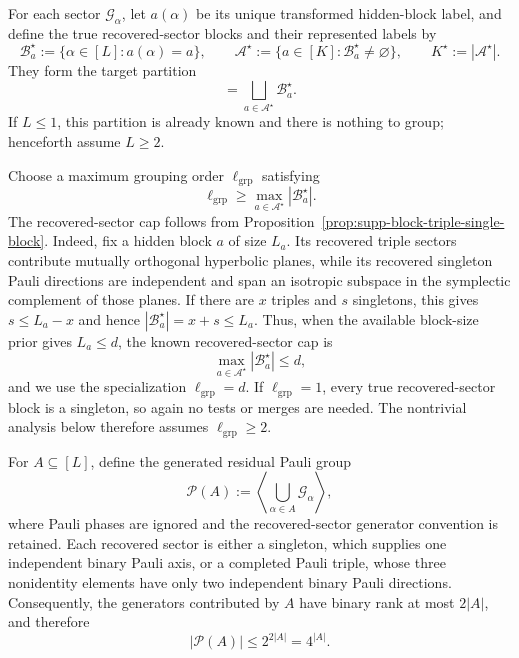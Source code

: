\documentclass[
  aps,
  prx,
  reprint,
  superscriptaddress,
  amsmath,
  amssymb,
  nofootinbib,
  longbibliography
]{revtex4-2}
\begin{document}
For each sector $\mathcal G_\alpha$, let $a(\alpha)$ be its unique
transformed hidden-block label, and define the true recovered-sector blocks
and their represented labels by
\begin{equation}
\mathcal B_a^\star
:=
\{\alpha\in[L]:a(\alpha)=a\},
\qquad
\mathcal A^\star
:=
\{a\in[K]:\mathcal B_a^\star\ne\varnothing\},
\qquad
K^\star:=|\mathcal A^\star|.
\label{eq:supp-true-recovered-sector-blocks}
\end{equation}
They form the target partition
\begin{equation}
[L]
=
\bigsqcup_{a\in\mathcal A^\star}\mathcal B_a^\star.
\label{eq:supp-true-recovered-sector-partition}
\end{equation}
If $L\le1$, this partition is already known and there is nothing to group;
henceforth assume $L\ge2$.

Choose a maximum grouping order $\ell_{\mathrm{grp}}$ satisfying
\begin{equation}
\ell_{\mathrm{grp}}
\ge
\max_{a\in\mathcal A^\star}|\mathcal B_a^\star|.
\label{eq:supp-grouping-order-promise}
\end{equation}
The recovered-sector cap follows from
Proposition~\ref{prop:supp-block-triple-single-block}.  Indeed, fix a hidden
block $a$ of size $L_a$.  Its recovered triple sectors contribute mutually
orthogonal hyperbolic planes, while its recovered singleton Pauli directions are
independent and span an isotropic subspace in the symplectic complement of
those planes.  If there are $x$ triples and $s$ singletons, this gives
$s\le L_a-x$ and hence
$|\mathcal B_a^\star|=x+s\le L_a$.  Thus, when the available block-size
prior gives $L_a\le d$, the known recovered-sector cap is
\begin{equation}
\max_{a\in\mathcal A^\star}|\mathcal B_a^\star|\le d,
\end{equation}
and we use the specialization $\ell_{\mathrm{grp}}=d$.  If
$\ell_{\mathrm{grp}}=1$, every true recovered-sector block is a singleton,
so again no tests or merges are needed.  The nontrivial analysis below
therefore assumes $\ell_{\mathrm{grp}}\ge2$.

For $A\subseteq[L]$, define the generated residual Pauli group
\begin{equation}
\mathcal P(A)
:=
\left\langle
\bigcup_{\alpha\in A}\mathcal G_\alpha
\right\rangle,
\label{eq:supp-cluster-pauli-set}
\end{equation}
where Pauli phases are ignored and the recovered-sector generator convention
is retained.  Each recovered sector is either a singleton, which supplies
one independent binary Pauli axis, or a completed Pauli triple, whose three
nonidentity elements have only two independent binary Pauli directions.  Consequently,
the generators contributed by $A$ have binary rank at most $2|A|$, and
therefore
\begin{equation}
|\mathcal P(A)|
\le
2^{2|A|}
=
4^{|A|}.
\label{eq:supp-generated-group-cardinality}
\end{equation}
\end{document}
